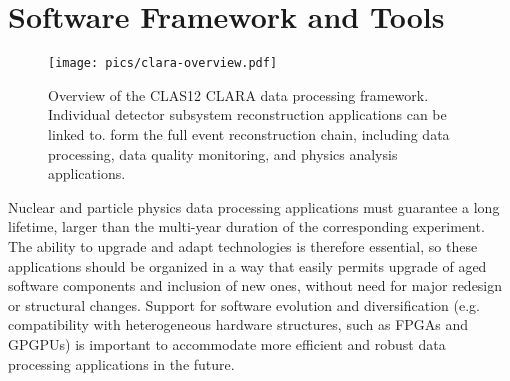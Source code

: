 \section{Software Framework and Tools}\label{sec:framework}


\begin{figure*}
\centering
\texttt{[image: pics/clara-overview.pdf]}
\caption{Overview of the CLAS12 CLARA data processing framework.  Individual detector subsystem reconstruction applications can be linked to. form the full event reconstruction chain, including  data processing, data quality monitoring, and physics analysis applications.}
\label{fig:clara-overview}
\end{figure*}
Nuclear and particle physics data processing applications must guarantee a long lifetime, larger than the multi-year duration of the corresponding experiment. The ability to upgrade and adapt technologies is therefore essential, so these applications should be organized in a way that easily permits upgrade of aged software components and inclusion of new ones, without need for major redesign or structural changes.  Support for software evolution and diversification (e.g. compatibility with heterogeneous hardware structures, such as FPGAs and GPGPUs) is important to accommodate more efficient and robust data processing applications in the future.


